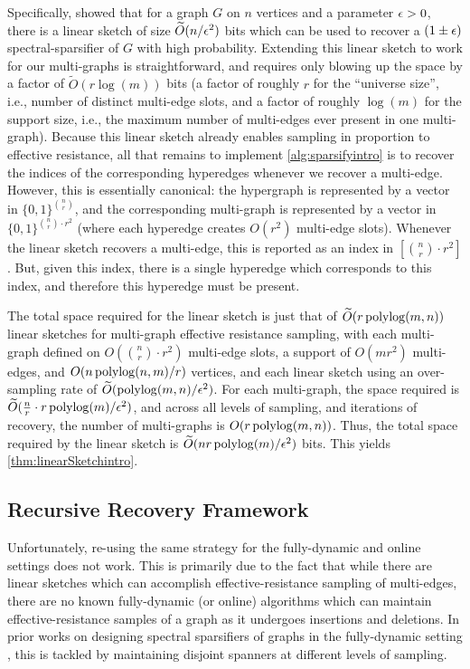 \documentclass{article}
\begin{document}
Specifically, \cite{KLMMS14} showed that for a graph $G$ on $n$ vertices and a parameter $\epsilon > 0$, there is a linear sketch of size $\widetilde{O}(n / \epsilon^2)$ bits which can be used to recover a $(1 \pm \epsilon)$ spectral-sparsifier of $G$ with high probability. Extending this linear sketch to work for our multi-graphs is straightforward, and requires only blowing up the space by a factor of $\widetilde{O}(r\log(m))$ bits (a factor of roughly $r$ for the ``universe size'', i.e., number of distinct multi-edge slots, and a factor of roughly $\log(m)$ for the support size, i.e., the maximum number of multi-edges ever present in one multi-graph). Because this linear sketch already enables sampling in proportion to effective resistance, all that remains to implement \cref{alg:sparsifyintro} is to recover the indices of the corresponding hyperedges whenever we recover a multi-edge. However, this is essentially canonical: the hypergraph is represented by a vector in $\{0,1\}^{\binom{n}{r}}$, and the corresponding multi-graph is represented by a vector in $\{0,1\}^{\binom{n}{r} \cdot r^2}$ (where each hyperedge creates $O(r^2)$ multi-edge slots). Whenever the linear sketch recovers a multi-edge, this is reported as an index in $[\binom{n}{r} \cdot r^2]$. But, given this index, there is a single hyperedge which corresponds to this index, and therefore this hyperedge must be present.

The total space required for the linear sketch is just that of $\widetilde{O}(r \operatorname{polylog}(m,n))$ linear sketches for multi-graph effective resistance sampling, with each multi-graph defined on $O(\binom{n}{r}\cdot r^2)$ multi-edge slots, a support of $O(mr^2)$ multi-edges, and $O(n\operatorname{polylog}(n,m)/r)$ vertices, and each linear sketch using an over-sampling rate of $\widetilde{O}(\operatorname{polylog}(m,n)/\epsilon^2)$. For each multi-graph, the space required is $\widetilde{O}(\frac{n}{r} \cdot r\operatorname{polylog}(m) / \epsilon^2)$, and across all levels of sampling, and iterations of recovery, the number of multi-graphs is $O(r \operatorname{polylog}(m,n))$. Thus, the total space required by the linear sketch is $\widetilde{O}(n r \operatorname{polylog}(m) / \epsilon^2)$ bits. This yields \cref{thm:linearSketchintro}.

\subsection{Recursive Recovery Framework}

Unfortunately, re-using the same strategy for the fully-dynamic and online settings does not work. This is primarily due to the fact that while there are linear sketches which can accomplish effective-resistance sampling of multi-edges, there are no known fully-dynamic (or online) algorithms which can maintain effective-resistance samples of a graph as it undergoes insertions and deletions. In prior works on designing spectral sparsifiers of graphs in the fully-dynamic setting \cite{ADKKP16}, this is tackled by maintaining disjoint spanners at different levels of sampling.
\end{document}
